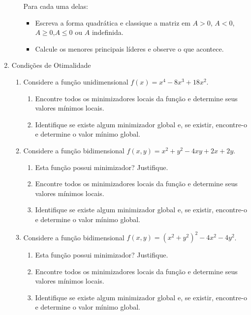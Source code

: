 \documentclass{article}
\begin{document}
\begin{enumerate}
\begin{enumerate}
        Para cada uma delas:
        \begin{itemize}
            \item Escreva a forma quadrática e classique a matriz em $A>0$, $A<0$, $A\geq0$,$A\leq0$ ou $A$ indefinida.
            \item Calcule os menores principais líderes e observe o que acontece. 
        \end{itemize}
    \end{enumerate}
    \item Condições de Otimalidade
    \begin{enumerate}
        \item  Considere a função unidimensional \(f(x) = x^4 - 8x^3 + 18x^2\). 
        \begin{enumerate}
            \item Encontre todos os minimizadores locais da função e determine seus valores mínimos locais.
            \item Identifique se existe algum minimizador global e, se existir, encontre-o e determine o valor mínimo global.      
        \end{enumerate}
        \item Considere a função bidimensional \(f(x, y) = x^2 + y^2 - 4xy + 2x + 2y\).
        \begin{enumerate}
            \item Esta função possui minimizador? Justifique.
            \item Encontre todos os minimizadores locais da função e determine seus valores mínimos locais.
            \item Identifique se existe algum minimizador global e, se existir, encontre-o e determine o valor mínimo global.
        \end{enumerate}
        \item Considere a função bidimensional \(f(x, y) = (x^2 + y^2)^2 - 4x^2 - 4y^2\).
        \begin{enumerate}
            \item Esta função possui minimizador? Justifique.
            \item Encontre todos os minimizadores locais da função e determine seus valores mínimos locais.
            \item Identifique se existe algum minimizador global e, se existir, encontre-o e determine o valor mínimo global.
        \end{enumerate}
    \end{enumerate}
\end{enumerate}
\end{document}
